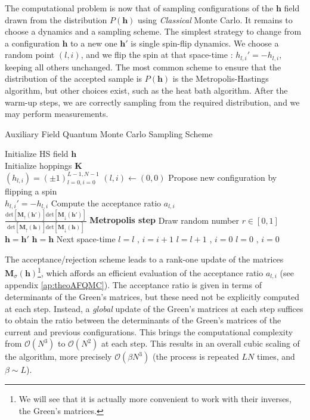 The computational problem is now that of sampling configurations of the $\bm h$ field drawn from the distribution $P(\bm h)$ using \emph{Classical} Monte Carlo.
It remains to choose a dynamics and a sampling scheme. The simplest strategy to change from a configuration $\bm h$ to a new one $\bm h'$ is single spin-flip dynamics. We choose a random point $(l, i)$, and we flip the spin at that space-time  :
$
h_{l, i}' = - h_{l, i},
$
keeping all others unchanged.
The most common scheme to ensure that the distribution of the accepted sample is $P(\bm h)$ is the Metropolis-Hastings algorithm, but other choices exist, such as the heat bath algorithm.
After the warm-up steps, we are correctly sampling from the required distribution, and we may perform measurements.

\begin{algorithm}
\caption{Auxiliary Field Quantum Monte Carlo Sampling Scheme}
\label{afqmcSampling}
\begin{algorithmic}[5]
  \STATE Initialize HS field $\bm h$  \\
  \STATE Initialize hoppings $\bm K$  \\
  \STATE  $(h_{l, i}) = (\pm 1)_{l=0, i = 0}^{L-1, N-1}$
  \STATE $(l, i) \leftarrow (0, 0)$
  \STATE \footnotesize{Propose new configuration by flipping a spin} \\ \normalsize{$h_{l, i}' = - h_{l, i}$} 
  \STATE \footnotesize{Compute the acceptance ratio $a_{l, i}$} \\
  \normalsize{$\frac{\text{det}[\bm M_\uparrow (\bm h')]\text{det}[\bm M_\downarrow (\bm h')]}{\text{det}[\bm M_\uparrow (\bm h)]\text{det}[\bm M_\downarrow (\bm h)]}$}
  \STATE \textbf{\normalsize{Metropolis step}}
  \STATE \footnotesize{Draw random number $r \in [0,1]$}
  \STATE $\bm h = \bm h'$
  \ELSE
  \STATE $\bm h = \bm h$
  \ENDIF
  \STATE Next space-time 
  \STATE $l = l$ , $i = i +1 $
  \ELSE
  \STATE $l = l+1$ , $i = 0 $
  \ENDIF
  \STATE $l = 0$ , $i=0$
  \ENDIF
  \ENDIF
  \ENDFOR
\end{algorithmic}
\end{algorithm}

The acceptance/rejection scheme leads to a rank-one update of the matrices $\bm M_\sigma (\bm h)$\footnote{We will see that it is actually more convenient to work with their inverses, the Green's matrices.}, which affords an efficient evaluation of the acceptance ratio $a_{l, i}$ \cite{hou_numerical_2009} (see appendix \ref{ap:theoAFQMC}).
The acceptance ratio is given in terms of determinants of the Green's matrices, but these need not be explicitly computed at each step.
Instead, a \emph{global} update of the Green's matrices at each step suffices to obtain the ratio between the determinants of the Green's matrices of the current and previous configurations.
This brings the computational complexity from $\mathcal{O}(N^3)$ to $\mathcal{O}(N^2)$ at each step.
This results in an overall cubic scaling of the algorithm, more precisely $\mathcal{O}(\beta N^3)$ (the process is repeated $L N$ times, and $\beta \sim L$).

